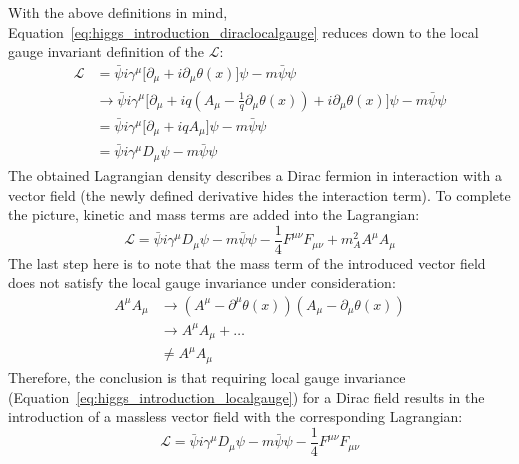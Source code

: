 With the above definitions in mind, Equation~\ref{eq:higgs_introduction_diraclocalgauge} reduces down to the local gauge invariant definition of the $\mathcal{L}$:
\begin{equation}\label{eq:higgs_introduction_diraclocalgauge}
    \begin{split}
    \mathcal{L}& = \bar{\psi}i\gamma^{\mu} \lbrack \partial_{\mu} + i\partial_{\mu}\theta(x) \rbrack \psi - m\bar{\psi}\psi\\
    & \rightarrow \bar{\psi}i\gamma^{\mu} \lbrack \partial_{\mu} + iq(A_{\mu} - \frac{1}{q}\partial_{\mu}\theta(x)) + i\partial_{\mu}\theta(x) \rbrack \psi - m\bar{\psi}\psi\\
    & = \bar{\psi}i\gamma^{\mu} \lbrack \partial_{\mu} + iqA_{\mu} \rbrack \psi - m\bar{\psi}\psi\\
    & = \bar{\psi}i\gamma^{\mu}D_{\mu}\psi - m\bar{\psi}\psi
    \end{split}
\end{equation}
The obtained Lagrangian density describes a Dirac fermion in interaction with a vector field (the newly defined derivative hides the interaction term). To complete the picture, kinetic and mass terms are added into the \label{eq:higgs_introduction_diraclocalgauge} Lagrangian:
\begin{equation}
    \label{eq:higgs_introduction_diracLagrangianwithvectormass}
    \mathcal{L} = \bar{\psi}i\gamma^{\mu}D_{\mu}\psi - m\bar{\psi}\psi - \frac{1}{4}F^{\mu\nu}F_{\mu\nu} + m_{A}^{2}A^{\mu}A_{\mu}
\end{equation}
The last step here is to note that the mass term of the introduced vector field does not satisfy the local gauge invariance under consideration:
\begin{equation}\label{eq:higgs_introduction_vectorfieldmassterm}
    \begin{split}
    A^{\mu}A_{\mu}& \rightarrow (A^{\mu} - \partial^{\mu}\theta(x))(A_{\mu} - \partial_{\mu}\theta(x))\\
    & \rightarrow A^{\mu}A_{\mu} + \hdots\\
    & \neq A^{\mu}A_{\mu}
    \end{split}
\end{equation}
Therefore, the conclusion is that requiring local gauge invariance (Equation~\ref{eq:higgs_introduction_localgauge}) for a Dirac field results in the introduction of a massless vector field with the corresponding Lagrangian:
\begin{equation}
    \label{eq:higgs_introduction_diracLagrangianwithoutvectormass}
    \mathcal{L} = \bar{\psi}i\gamma^{\mu}D_{\mu}\psi - m\bar{\psi}\psi - \frac{1}{4}F^{\mu\nu}F_{\mu\nu}
\end{equation}
